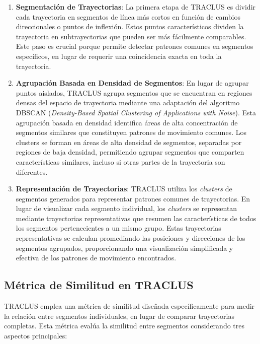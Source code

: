 \begin{enumerate}
    \item \textbf{Segmentación de Trayectorias}: La primera etapa de TRACLUS es dividir cada trayectoria en segmentos de línea más cortos en función de cambios direccionales o puntos de inflexión. Estos puntos característicos dividen la trayectoria en subtrayectorias que pueden ser más fácilmente comparables. Este paso es crucial porque permite detectar patrones comunes en segmentos específicos, en lugar de requerir una coincidencia exacta en toda la trayectoria.

    \item \textbf{Agrupación Basada en Densidad de Segmentos}: En lugar de agrupar puntos aislados, TRACLUS agrupa segmentos que se encuentran en regiones densas del espacio de trayectoria mediante una adaptación del algoritmo DBSCAN (\textit{Density-Based Spatial Clustering of Applications with Noise}). Esta agrupación basada en densidad identifica áreas de alta concentración de segmentos similares que constituyen patrones de movimiento comunes. Los clusters se forman en áreas de alta densidad de segmentos, separadas por regiones de baja densidad, permitiendo agrupar segmentos que comparten características similares, incluso si otras partes de la trayectoria son diferentes.
    
      \item \textbf{Representación de Trayectorias}:  
    TRACLUS utiliza los \textit{clusters} de segmentos generados para representar patrones comunes de trayectorias. En lugar de visualizar cada segmento individual, los \textit{clusters} se representan mediante trayectorias representativas que resumen las características de todos los segmentos pertenecientes a un mismo grupo. Estas trayectorias representativas se calculan promediando las posiciones y direcciones de los segmentos agrupados, proporcionando una visualización simplificada y efectiva de los patrones de movimiento encontrados.
\end{enumerate}

\subsection*{Métrica de Similitud en TRACLUS}

TRACLUS emplea una métrica de similitud diseñada específicamente para medir la relación entre segmentos individuales, en lugar de comparar trayectorias completas. Esta métrica evalúa la similitud entre segmentos considerando tres aspectos principales:

